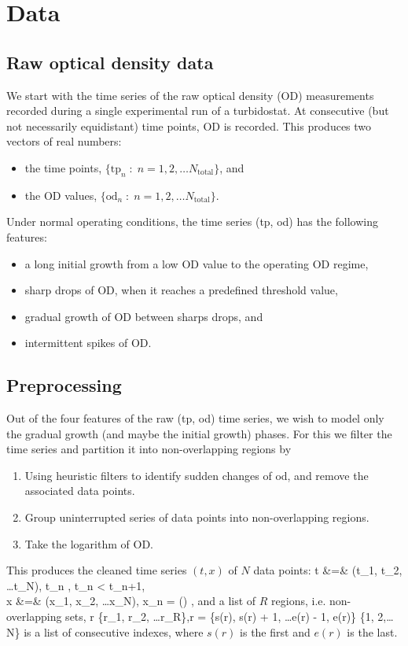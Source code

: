 \section{Data}

\subsection{Raw optical density data}
We start with the time series of the raw optical density (OD) measurements recorded during a single experimental run of a turbidostat. At consecutive (but not necessarily equidistant) time points, OD is recorded. This produces two vectors of real numbers:
\begin{itemize}
	\item the time points, $\{\text{tp}_n\;:\; n = 1,2, \ldots N_\text{total}\}$, and
	\item the OD values, $\{\text{od}_n\;:\; n = 1,2, \ldots N_\text{total}\}$.
\end{itemize}
Under normal operating conditions, the time series (tp, od) has the following features:
\begin{itemize}
	\item a long initial growth from a low OD value to the operating OD regime,
	\item sharp drops of OD, when it reaches a predefined threshold value,
	\item gradual growth of OD between sharps drops, and
	\item intermittent spikes of OD.
\end{itemize}

\subsection{Preprocessing}
Out of the four features of the raw (tp, od) time series, we wish to model only the gradual growth (and maybe the initial growth) phases. For this we filter the time series and partition it into non-overlapping regions by 
\begin{enumerate}
	\item Using heuristic filters to identify sudden changes of od, and remove the associated data points.
	\item Group uninterrupted series of data points into non-overlapping regions.
	\item Take the logarithm of OD.
\end{enumerate}
This produces the cleaned time series $(t, x)$ of $N$ data points:
\ba
	t &=& (t_1, t_2, \ldots t_N), \quad {}\; t_n \in {},\quad {}\; t_n < t_{n+1}, \\
	x &=& (x_1, x_2, \ldots x_N), \quad {}\; x_n = \log() \in {},
\ea
and a list of $R$ regions, i.e. non-overlapping sets,
\be
	r \in \{r_1, r_2, \ldots r_R\},\qquad {}r = \{s(r), s(r) + 1, \ldots e(r) - 1, e(r)\} \subset \{1, 2,\ldots N\}
\ee
is a list of consecutive indexes, where $s(r)$ is the first and $e(r)$ is the last.
